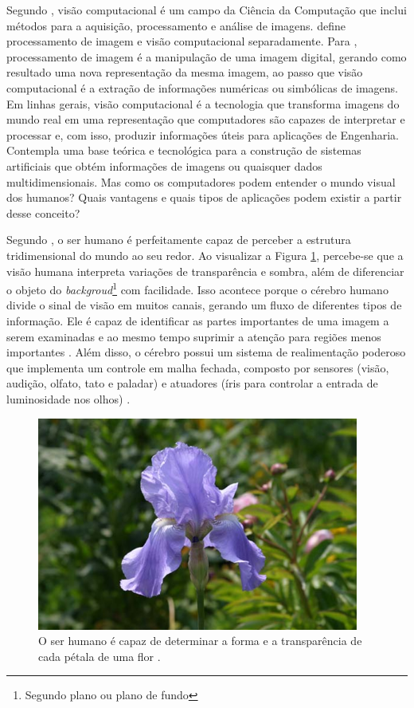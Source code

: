 
Segundo \cite{linda:2001:book}, visão computacional é um campo da Ciência da Computação que inclui métodos para a aquisição, processamento e análise de imagens. \cite{morris:2004:book} define processamento de imagem e visão computacional separadamente. Para \citeauthor{morris:2004:book}, processamento de imagem é a manipulação de uma imagem digital, gerando como resultado uma nova representação da mesma imagem, ao passo que visão computacional é a extração de informações numéricas ou simbólicas de imagens. Em linhas gerais, visão computacional é a tecnologia que transforma imagens do mundo real em uma representação que computadores são capazes de interpretar e processar e, com isso, produzir informações úteis para aplicações de Engenharia. Contempla uma base teórica e tecnológica para a construção de sistemas artificiais que obtém informações de imagens ou quaisquer dados multidimensionais. Mas como os computadores podem entender o mundo visual dos humanos? Quais vantagens e quais tipos de aplicações podem existir a partir desse conceito?

Segundo \cite{szeliski:2010:book}, o ser humano é perfeitamente capaz de perceber a estrutura tridimensional do mundo ao seu redor. Ao visualizar a Figura \ref{fig:flower}, percebe-se que a visão humana interpreta variações de transparência e sombra, além de diferenciar o objeto do \textit{backgroud}\footnote{Segundo plano ou plano de fundo} com facilidade. Isso acontece porque o cérebro humano divide o sinal de visão em muitos canais, gerando um fluxo de diferentes tipos de informação. Ele é capaz de identificar as partes importantes de uma imagem a serem examinadas e ao mesmo tempo suprimir a atenção para regiões menos importantes \citep{szeliski:2010:book}. Além disso, o cérebro possui um sistema de realimentação poderoso que implementa um controle em malha fechada, composto por sensores (visão, audição, olfato, tato e paladar) e atuadores (íris para controlar a entrada de luminosidade nos olhos) \citep{opencv:2008:book}.

\begin{figure}[ht]
  \begin{center}
    \includegraphics{imgs/flower.png}
  \end{center}
  \caption{O ser humano é capaz de determinar a forma e a transparência de cada pétala de uma flor \citep{szeliski:2010:book}.}
  \label{fig:flower}
\end{figure}

